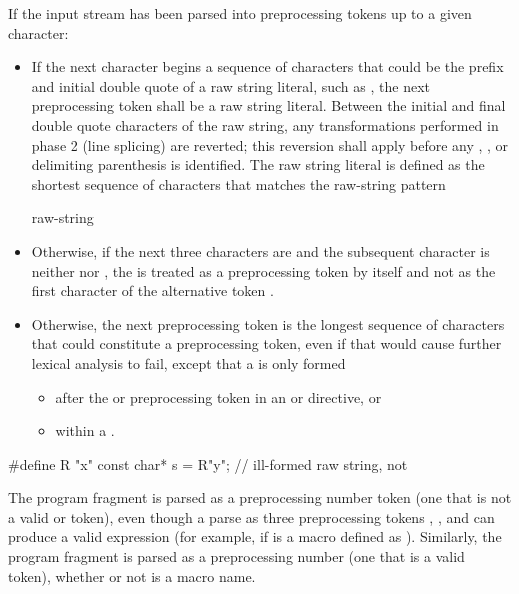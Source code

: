 \pnum
If the input stream has been parsed into preprocessing tokens up to a
given character:
\begin{itemize}
\item
{}%
If the next character begins a sequence of characters that could be the prefix
and initial double quote of a raw string literal, such as , the next preprocessing
token shall be a raw string literal. Between the initial and final
double quote characters of the raw string, any transformations performed in phase
2 (line splicing) are reverted; this reversion
shall apply before any , , or delimiting
parenthesis is identified. The raw string literal is defined as the shortest sequence
of characters that matches the raw-string pattern
\begin{ncbnf}
  raw-string
\end{ncbnf}

\item Otherwise, if the next three characters are \tcode{<::} and the subsequent character
is neither \tcode{:} nor \tcode{>}, the \tcode{<} is treated as a preprocessing token by
itself and not as the first character of the alternative token \tcode{<:}.

\item Otherwise,
the next preprocessing token is the longest sequence of
characters that could constitute a preprocessing token, even if that
would cause further lexical analysis to fail,
except that a  is only formed
\begin{itemize}
\item
after the  or  preprocessing token in an
 or
 directive, or

\item
within a .

\end{itemize}
\end{itemize}

\begin{example}
\begin{codeblock}
#define R "x"
const char* s = R"y";           // ill-formed raw string, not 
\end{codeblock}
\end{example}

\pnum
\begin{example}
The program fragment  is parsed as a
preprocessing number token (one that is not a valid
 or  token),
even though a parse as three preprocessing tokens
, \tcode{+}, and  can produce a valid expression (for example,
if  is a macro defined as ). Similarly, the
program fragment  is parsed as a preprocessing number (one
that is a valid  token),
whether or not  is a macro name.
\end{example}

